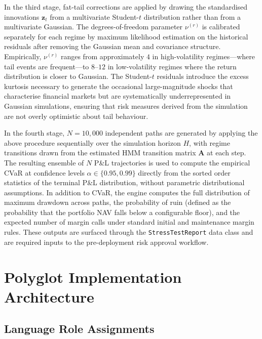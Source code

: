\documentclass[12pt,openany]{book}
\numberwithin{equation}{chapter}
\theoremstyle{plain}
\theoremstyle{definition}
\theoremstyle{remark}
\begin{document}
In the third stage, fat-tail corrections are applied by drawing the standardised innovations $\mathbf{z}_t$ from a multivariate Student-$t$ distribution rather than from a multivariate Gaussian. The degrees-of-freedom parameter $\nu^{(r)}$ is calibrated separately for each regime by maximum likelihood estimation on the historical residuals after removing the Gaussian mean and covariance structure. Empirically, $\nu^{(r)}$ ranges from approximately $4$ in high-volatility regimes---where tail events are frequent---to $8$--$12$ in low-volatility regimes where the return distribution is closer to Gaussian. The Student-$t$ residuals introduce the excess kurtosis necessary to generate the occasional large-magnitude shocks that characterise financial markets but are systematically underrepresented in Gaussian simulations, ensuring that risk measures derived from the simulation are not overly optimistic about tail behaviour.

In the fourth stage, $N = 10{,}000$ independent paths are generated by applying the above procedure sequentially over the simulation horizon $H$, with regime transitions drawn from the estimated HMM transition matrix $\mathbf{A}$ at each step. The resulting ensemble of $N$ P\&L trajectories is used to compute the empirical CVaR at confidence levels $\alpha \in \{0.95, 0.99\}$ directly from the sorted order statistics of the terminal P\&L distribution, without parametric distributional assumptions. In addition to CVaR, the engine computes the full distribution of maximum drawdown across paths, the probability of ruin (defined as the probability that the portfolio NAV falls below a configurable floor), and the expected number of margin calls under standard initial and maintenance margin rules. These outputs are surfaced through the \texttt{StressTestReport} data class and are required inputs to the pre-deployment risk approval workflow.

\chapter{Polyglot Implementation Architecture}

\section{Language Role Assignments}
\end{document}
